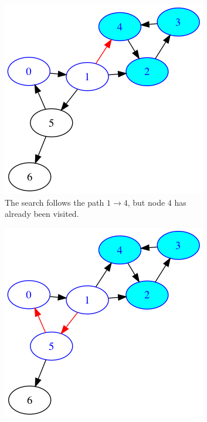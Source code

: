 \begin{figure}
\begin{subfigure}{0.3\textwidth}
\includegraphics[width=\linewidth]{images/tarjan/3.png}
\caption{The search follows the path $1 \rightarrow 4$, but node $4$ has already been visited.} \label{fig:tarjan3}
\end{subfigure}
\hspace*{\fill} %
\begin{subfigure}{0.3\textwidth}
\includegraphics[width=\linewidth]{images/tarjan/4.png}

\end{subfigure}
\end{figure}
